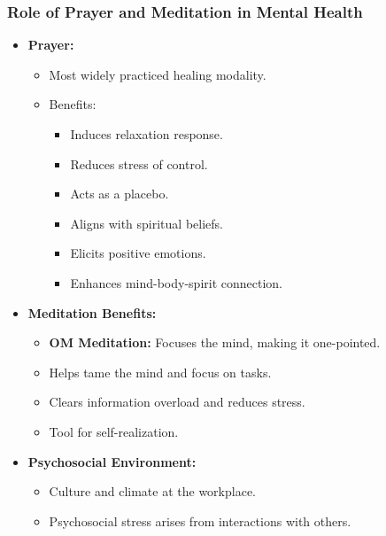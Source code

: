 \begin{frame}[fragile]\frametitle{Role of Prayer and Meditation in Mental Health}

      \begin{itemize}
        \item \textbf{Prayer:}
        \begin{itemize}
            \item Most widely practiced healing modality.
            \item Benefits:
                \begin{itemize}
                    \item Induces relaxation response.
                    \item Reduces stress of control.
                    \item Acts as a placebo.
                    \item Aligns with spiritual beliefs.
                    \item Elicits positive emotions.
                    \item Enhances mind-body-spirit connection.
                \end{itemize}
        \end{itemize}
        \item \textbf{Meditation Benefits:}
        \begin{itemize}
            \item \textbf{OM Meditation:} Focuses the mind, making it one-pointed.
            \item Helps tame the mind and focus on tasks.
            \item Clears information overload and reduces stress.
            \item Tool for self-realization.
        \end{itemize}
        \item \textbf{Psychosocial Environment:}
        \begin{itemize}
            \item Culture and climate at the workplace.
            \item Psychosocial stress arises from interactions with others.
        \end{itemize}
      \end{itemize}

\end{frame}

